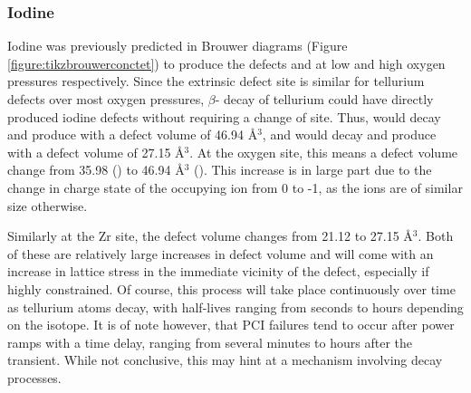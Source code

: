 
\subsubsection{Iodine}

Iodine was previously predicted in Brouwer diagrams (Figure \ref{figure:tikzbrouwerconctet}) to produce the defects  and  at low and high oxygen pressures respectively. Since the extrinsic defect site is similar for tellurium defects over most oxygen pressures, $\beta$- decay of tellurium could have directly produced iodine defects without requiring a change of site. Thus,  would decay and produce  with a defect volume of 46.94 \r{A}$^{3}$, and  would decay and produce  with a defect volume of 27.15 \r{A}$^{3}$. At the oxygen site, this means a defect volume change from 35.98 () to 46.94 \r{A}$^{3}$ (). This increase is in large part due to the change in charge state of the occupying ion from 0 to -1, as the ions are of similar size otherwise. 

Similarly at the Zr site, the defect volume changes from 21.12 to 27.15 \r{A}$^{3}$. Both of these are relatively large increases in defect volume and will come with an increase in lattice stress in the immediate vicinity of the defect, especially if highly constrained. Of course, this  process will take place continuously over time as tellurium atoms decay, with half-lives ranging from seconds to hours depending on the isotope. It is of note however, that PCI failures tend to occur after power ramps with a time delay, ranging from several minutes to hours after the transient. While not conclusive, this may hint at a mechanism involving decay processes. 

